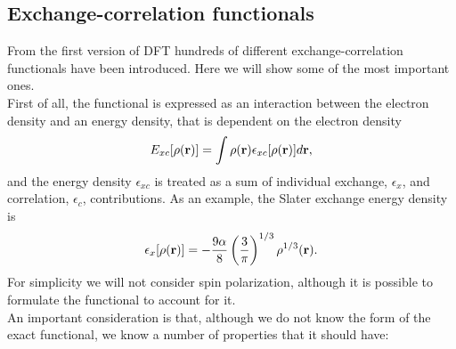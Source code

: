 \subsection{Exchange-correlation functionals}
From the first version of DFT hundreds of different exchange-correlation functionals have been introduced. Here we will show some of the most important ones. \\
First of all, the functional is expressed as an interaction between the electron density and an energy density, that is dependent on the electron density
\begin{equation}
    E_{xc}[\rho({\bf r})] = \int \rho({\bf r}) \epsilon_{xc}[\rho({\bf r})] d{\bf r},
\end{equation}
and the energy density $\epsilon_{xc}$ is treated as a sum of individual exchange, $\epsilon_x$, and correlation, $\epsilon_c$, contributions. As an example, the Slater exchange energy density is
\begin{equation}
    \epsilon_{x} [\rho({\bf r})] = -\frac{9 \alpha}{8} \left( \frac{3}{\pi} \right)^{1/3} \rho^{1/3}({\bf r}). \label{Slater}
\end{equation}
For simplicity we will not consider spin polarization, although it is possible to formulate the functional to account for it. \\
An important consideration is that, although we do not know the form of the exact functional, we know a number of properties that it should have: \cite{Jensen2011Dec}
